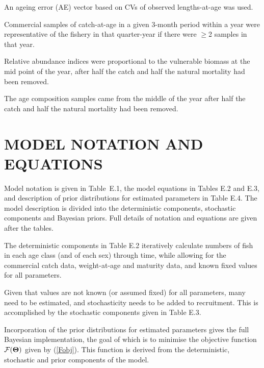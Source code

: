 \documentclass[11pt]{book}
\newcommand{\Fobj}{\mathcal{F}}%
\def\bfTh{{\bf \Theta}}%
\def\AppLet{E}                   %
\def\bfTh{{\bf \Theta}}          %
\newcommand{\eref}[1]{(\ref{#1})}
\begin{document}
\begin{enumerate_csas}{}{}
\item An ageing error (AE) vector based on CVs of observed lengths-at-age was used.
\item Commercial samples of catch-at-age in a given 3-month period within a year were representative of the fishery in that quarter-year if there were $\geq$2 samples in that year.
\item Relative abundance indices were proportional to the vulnerable biomass at the mid point of the year, after half the catch and half the natural mortality had been removed.
\item The age composition samples came from the middle of the year after half the catch and half the natural mortality had been removed.
\end{enumerate_csas}

\section{MODEL NOTATION AND EQUATIONS}

Model notation is given in Table~\AppLet.1, the model equations in Tables \AppLet.2 and \AppLet.3, and description of prior distributions for estimated parameters in Table \AppLet.4. The model description is divided into the deterministic components, stochastic components and Bayesian priors. Full details of notation and equations are given after the tables. %

The deterministic components in Table \AppLet.2 iteratively calculate numbers of fish in each age class (and of each sex) through time, while allowing for the commercial catch data, weight-at-age and maturity data, and known fixed values for all parameters.

Given that values are not known (or assumed fixed) for all parameters, many need to be estimated, and stochasticity needs to be added to recruitment.
This is accomplished by the stochastic components given in Table \AppLet.3. 

Incorporation of the prior distributions for estimated parameters gives the full Bayesian implementation, the goal of which is to minimise the objective function $\Fobj(\bfTh)$ given by \eref{Fobj}. 
This function is derived from the deterministic, stochastic and prior components of the model. %

\newpage
\end{document}
